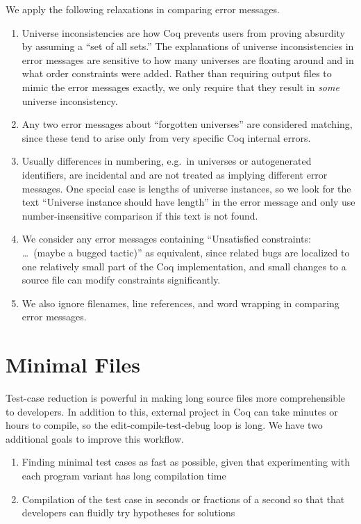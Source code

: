 \documentclass[a4paper,USenglish,cleveref,autoref,thm-restate]{lipics-v2021}
\begin{document}
We apply the following relaxations in comparing error messages.
\begin{enumerate}

\item Universe inconsistencies are how Coq prevents users from proving absurdity by assuming a ``set of all sets.''
The explanations of universe inconsistencies in error messages are sensitive to how many universes are floating around and in what order constraints were added.
Rather than requiring output files to mimic the error messages exactly, we only require that they result in \emph{some} universe inconsistency.

\item Any two error messages about ``forgotten universes'' are considered matching, since these tend to arise only from very specific Coq internal errors.

\item Usually differences in numbering, e.g.\ in universes or autogenerated identifiers, are incidental and are not treated as implying different error messages.  One special case is lengths of universe instances, so we look for the text ``Universe instance should have length'' in the error message and only use number-insensitive comparison if this text is not found.

\item We consider any error messages containing ``Unsatisfied constraints: \ldots\ (maybe a bugged tactic)'' as equivalent, since related bugs are localized to one relatively small part of the Coq implementation, and small changes to a source file can modify constraints significantly.

\item We also ignore filenames, line references, and word wrapping in comparing error messages.

\end{enumerate}

\section{Minimal Files}\label{sec:minimal}

Test-case reduction is powerful in making long source files more comprehensible to developers.
In addition to this, external project in Coq can take minutes or hours to compile, so the edit-compile-test-debug loop is long.
We have two additional goals to improve this workflow.
\begin{enumerate}
\item Finding minimal test cases as fast as possible, given that experimenting with each program variant has long compilation time
\item Compilation of the test case in seconds or fractions of a second so that that developers can fluidly try hypotheses for solutions
\end{enumerate}
\end{document}
